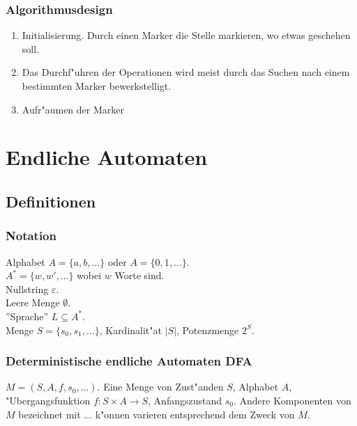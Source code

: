 \documentclass[german, 10pt, a4paper, twocolumn]{scrartcl}
\theoremstyle{definition}
\theoremstyle{example}
\begin{document}
\subsubsection{Algorithmusdesign}

\begin{enumerate}
	\item Initialisierung. Durch einen Marker die Stelle markieren, wo etwas geschehen soll.
	\item Das Durchf"uhren der Operationen wird meist durch das Suchen nach einem bestimmten Marker bewerkstelligt.
	\item Aufr"aumen der Marker
\end{enumerate}

\section{Endliche Automaten}

\subsection{Definitionen}

\subsubsection{Notation}

Alphabet $A=\{a,b,\ldots\}$ oder $A=\{0,1,\ldots\}$.\\
$A^* = \{w, w', \ldots\}$ wobei $w$ Worte sind.\\
Nullstring $\varepsilon$.\\
Leere Menge $\emptyset$.\\
''Sprache'' $L \subseteq A^*$.\\
Menge $S = \{s_0, s_1, \ldots\}$, Kardinalit"at $|S|$, Potenzmenge $2^{S}$.

\subsubsection{Deterministische endliche Automaten DFA}

$M=(S, A, f, s_0, \ldots)$. Eine Menge von Zust"anden $S$, Alphabet $A$, "Ubergangsfunktion $f: S \times A \to S$, Anfangszustand $s_0$. Andere Komponenten von $M$ bezeichnet mit $\ldots$ k"onnen varieren entsprechend dem Zweck von $M$.
\end{document}
